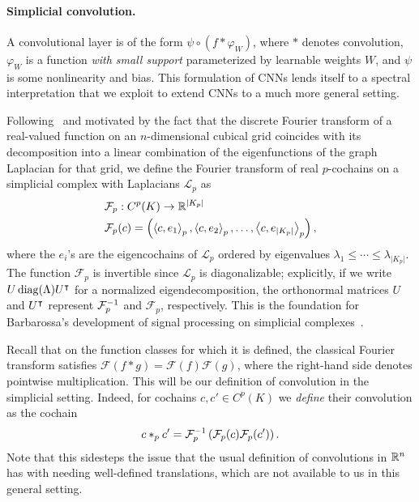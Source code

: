 \paragraph{Simplicial convolution.}

A convolutional layer is of the form $\psi\circ(f\ast \varphi_W)$, where $\ast$ denotes convolution, $\varphi_W$ is a function
\emph{with small support} parameterized by learnable weights $W$, and $\psi$ is some nonlinearity and bias. This formulation of CNNs lends itself to a spectral interpretation that we exploit to extend CNNs to a much more general setting.

Following~\cite{defferrard2016convolutional} and motivated by the fact that the discrete Fourier transform of a real-valued function on an $n$-dimensional cubical grid coincides with its decomposition into a linear combination of the eigenfunctions of the graph Laplacian for that grid, we define the Fourier transform of real $p$-cochains on a simplicial complex with Laplacians $\mathcal{L}_p$ as
\begin{align*}
  &\mathcal{F}_p: C^p(K) \to \mathbb{R}^{\lvert K_p \rvert} \\
  &\mathcal{F}_p(c) = \left(\left\langle c , e_1 \right\rangle_p, \left\langle c , e_2 \right\rangle_p, \dotsc, \left\langle c , e_{\lvert K_p \rvert} \right\rangle_p\right),
\end{align*}
where the $e_i$'s are the eigencochains of $\mathcal{L}_p$ ordered by eigenvalues $\lambda_1\leq\dotsm\leq\lambda_{\lvert K_p \rvert}$. The function $\mathcal{F}_p$ is invertible since $\mathcal{L}_p$ is diagonalizable; explicitly, if we write $U\operatorname{diag}(\Lambda)U^{\intercal}$ for a normalized eigendecomposition, the orthonormal matrices $U$ and $U^{\intercal}$ represent $\mathcal{F}^{-1}_p$ and $\mathcal{F}_p$, respectively. This is the foundation for Barbarossa's development of signal processing on simplicial complexes~\cite{barbarossa2018learning}.

Recall that on the function classes for which it is defined, the classical Fourier transform satisfies $\mathcal{F}(f\ast g)=\mathcal{F}(f)\mathcal{F}(g)$, where the right-hand side denotes pointwise multiplication. This will be our definition of convolution in the simplicial setting. Indeed, for cochains $c,c'\in C^p(K)$ we \emph{define} their convolution as the cochain
\begin{equation*}
  c\ast_p c' = \mathcal{F}_p^{-1}\left(\mathcal{F}_p(c)\mathcal{F}_p(c')\right). 
\end{equation*}
Note that this sidesteps the issue that the usual definition of convolutions in $\mathbb{R}^n$ has with needing well-defined translations, which are not available to us in this general setting.


